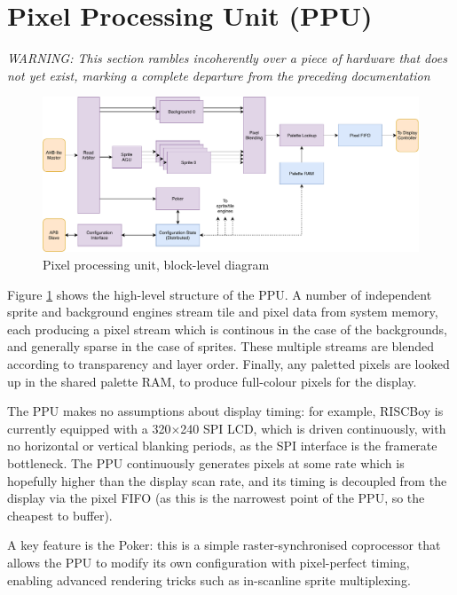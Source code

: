 \section{Pixel Processing Unit (PPU)}

{\it WARNING: This section rambles incoherently over a piece of hardware that does not yet exist, marking a complete departure from the preceding documentation}

\begin{figure}[!htb]
\centering
\caption{Pixel processing unit, block-level diagram}
\label{diagram:ppu_block}
\includegraphics[width=\textwidth]{diagrams/ppu_block.pdf}
\end{figure}

Figure \ref{diagram:ppu_block} shows the high-level structure of the PPU. A number of independent sprite and background engines stream tile and pixel data from system memory, each producing a pixel stream which is continous in the case of the backgrounds, and generally sparse in the case of sprites. These multiple streams are blended according to transparency and layer order. Finally, any paletted pixels are looked up in the shared palette RAM, to produce full-colour pixels for the display.

The PPU makes no assumptions about display timing: for example, RISCBoy is currently equipped with a 320$\times$240 SPI LCD, which is driven continuously, with no horizontal or vertical blanking periods, as the SPI interface is the framerate bottleneck. The PPU continuously generates pixels at some rate which is hopefully higher than the display scan rate, and its timing is decoupled from the display via the pixel FIFO (as this is the narrowest point of the PPU, so the cheapest to buffer).

A key feature is the Poker: this is a simple raster-synchronised coprocessor that allows the PPU to modify its own configuration with pixel-perfect timing, enabling advanced rendering tricks such as in-scanline sprite multiplexing.

